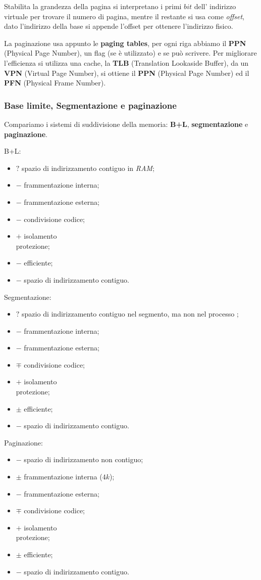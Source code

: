 Stabilita la grandezza della pagina si interpretano i primi $bit$ dell' 
indirizzo virtuale per trovare il numero di pagina, mentre il restante si usa
come \emph{offset}, dato l'indirizzo della base si appende l'offset per
ottenere l'indirizzo fisico.


La paginazione usa appunto le \textbf{paging tables}, per ogni riga abbiamo
il \textbf{PPN} (Physical Page Number), un flag (se è utilizzato) e se può
scrivere.
Per migliorare l'efficienza si utilizza una cache, la \textbf{TLB} (Translation
Lookaside Buffer), da un \textbf{VPN} (Virtual Page Number), si ottiene il
\textbf{PPN} (Physical Page Number) ed il \textbf{PFN} (Physical Frame Number).


\subsubsection{Base limite, Segmentazione e paginazione}
Compariamo i sistemi di suddivisione della memoria: \textbf{B+L}, \textbf{
segmentazione} e \textbf{paginazione}.

B+L:
\begin{itemize}
  \item $?$ spazio di indirizzamento contiguo in \emph{RAM};
  \item $-$ frammentazione interna;
  \item $-$ frammentazione esterna;
  \item $-$ condivisione codice;
  \item $+$ isolamento\\protezione;
  \item $-$ efficiente;
  \item $-$ spazio di indirizzamento contiguo.
\end{itemize}

Segmentazione:
\begin{itemize}
  \item $?$ spazio di indirizzamento contiguo nel segmento, ma non nel processo
    ;
  \item $-$ frammentazione interna;
  \item $-$ frammentazione esterna;
  \item $\mp$ condivisione codice;
  \item $+$ isolamento\\protezione;
  \item $\pm$ efficiente;
  \item $-$ spazio di indirizzamento contiguo.
\end{itemize}

Paginazione:
\begin{itemize}
  \item $-$ spazio di indirizzamento non contiguo;
  \item $\pm$ frammentazione interna ($4k$);
  \item $-$ frammentazione esterna;
  \item $\mp$ condivisione codice;
  \item $+$ isolamento\\protezione;
  \item $\pm$ efficiente;
  \item $-$ spazio di indirizzamento contiguo.
\end{itemize}
